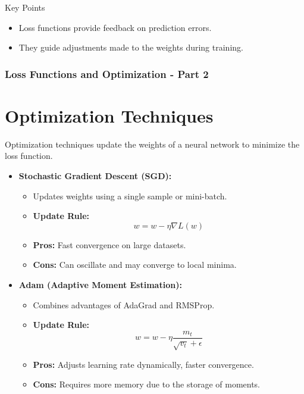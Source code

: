 \documentclass[aspectratio=169]{beamer}
\begin{document}
\begin{frame}[fragile]
    \begin{block}{Key Points}
        \begin{itemize}
            \item Loss functions provide feedback on prediction errors.
            \item They guide adjustments made to the weights during training.
        \end{itemize}
    \end{block}
\end{frame}

\begin{frame}[fragile]
    \frametitle{Loss Functions and Optimization - Part 2}

    \section{Optimization Techniques}
    Optimization techniques update the weights of a neural network to minimize the loss function.
    
    \begin{itemize}
        \item \textbf{Stochastic Gradient Descent (SGD):}
        \begin{itemize}
            \item Updates weights using a single sample or mini-batch.
            \item \textbf{Update Rule:}
            \begin{equation}
            w = w - \eta \nabla L(w)
            \end{equation}
            \item \textbf{Pros:} Fast convergence on large datasets.
            \item \textbf{Cons:} Can oscillate and may converge to local minima.
        \end{itemize}

        \item \textbf{Adam (Adaptive Moment Estimation):}
        \begin{itemize}
            \item Combines advantages of AdaGrad and RMSProp.
            \item \textbf{Update Rule:}
            \begin{equation}
            w = w - \eta \frac{m_t}{\sqrt{v_t} + \epsilon}
            \end{equation}
            \item \textbf{Pros:} Adjusts learning rate dynamically, faster convergence.
            \item \textbf{Cons:} Requires more memory due to the storage of moments.
        \end{itemize}
    \end{itemize}


\end{frame}
\end{document}
